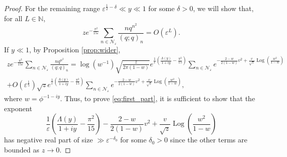 \documentclass[11pt,reqno]{amsart}
\theoremstyle{remark}
\numberwithin{equation}{section}
\def\Log{\operatorname{Log}}
\def\Log{\operatorname{Log}}
\begin{document}
\begin{proof}
For the remaining range $\varepsilon^{\frac12-\delta}\ll y \ll 1$ for some $\delta>0$, we will show that, for all $L \in \mathbb{N}$,
\begin{equation}\label{eq:first_part}
	z e^{-\frac{\pi^2}{15\varepsilon}}\sum_{n \in \mathcal{N}_{\varepsilon}} \frac{nq^{n^2}}{(q;q)_n} = O\left(\varepsilon^L\right).
\end{equation}
If $y \ll 1$, by Proposition \ref{prop:wider},
\begin{multline*}
	z e^{-\frac{\pi^2}{15\varepsilon}}\sum_{n \in \mathcal{N}_{\varepsilon}} \frac{nq^{n^2}}{(q;q)_n} = \log(w^{-1})\sqrt{\frac{z}{2\pi(1-w)}} e^{\frac{1}{\varepsilon}\left(\frac{\Lambda(y)}{1+iy}-\frac{\pi^2}{15}\right)} \sum_{n \in \mathcal{N}_{\varepsilon}} e^{-\frac{2-w}{2(1-w)}v^2 +\frac{v}{\sqrt{z}} \Log\left(\frac{w^2}{1-w}\right)}\\
	+ O\left(\varepsilon^{\frac15}\right) \sqrt{z} e^{\frac{1}{\varepsilon}\left(\frac{\Lambda(y)}{1+iy}-\frac{\pi^2}{15}\right)} \sum_{n \in \mathcal{N}_{\varepsilon}}  e^{-\frac{2-w}{2(1-w)}v^2 +\frac{v}{\sqrt{z}} \Log\left(\frac{w^2}{1-w}\right)},
\end{multline*}
where $w=\phi^{-1-iy}$. 
Thus, to prove \eqref{eq:first_part}, it is sufficient to show that the exponent
\begin{equation}\label{eq:exp}
	\frac{1}{\varepsilon}\left(\frac{\Lambda(y)}{1+iy}-\frac{\pi^2}{15}\right) -\frac{2-w}{2(1-w)}v^2 +\frac{v}{\sqrt{z}} \Log\left(\frac{w^2}{1-w}\right)
\end{equation}
has negative real part of size $\gg \varepsilon^{-\delta_0}$ for some $\delta_0>0$ since the other terms are bounded as $z\to 0$. 


\end{proof}
\end{document}
